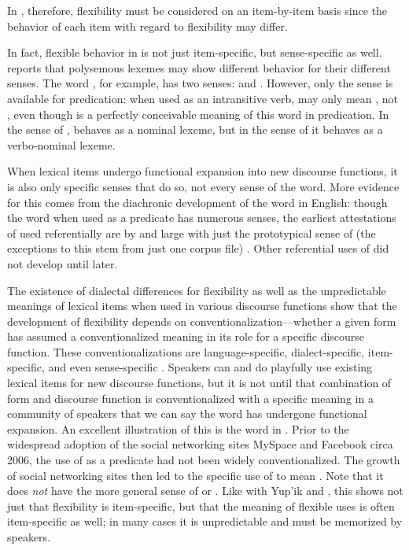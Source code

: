 \noindent In , therefore, flexibility must be considered on an item-by-item basis since the behavior of each item with regard to flexibility may differ.

In fact, flexible behavior in  is not just item-specific, but sense-specific as well. \textcite[54]{Creissels2017} reports that polysemous lexemes may show different behavior for their different senses. The word , for example, has two senses:  and . However, only the  sense is available for predication: when used as an intransitive verb,  may only mean , not , even though  is a perfectly conceivable meaning of this word in predication. In the sense of ,  behaves as a nominal lexeme, but in the sense of  it behaves as a verbo-nominal lexeme.

When lexical items undergo functional expansion into new discourse functions, it is also only specific senses that do so, not every sense of the word. More evidence for this comes from the diachronic development of the word  in English: though the word  when used as a predicate has numerous senses, the earliest attestations of  used referentially are by and large with just the prototypical sense of  (the exceptions to this stem from just one corpus file) \parencite[76]{Gries2006}. Other referential uses of  did not develop until later.

The existence of dialectal differences for flexibility as well as the unpredictable meanings of lexical items when used in various discourse functions show that the development of flexibility depends on conventionalization—whether a given form has assumed a conventionalized meaning in its role for a specific discourse function. These conventionalizations are language-specific, dialect-specific, item-specific, and even sense-specific \parencite[97]{Croft2000}. Speakers can and do playfully use existing lexical items for new discourse functions, but it is not until that combination of form and discourse function is conventionalized with a specific meaning in a community of speakers that we can say the word has undergone functional expansion. An excellent illustration of this is the word  in . Prior to the widespread adoption of the social networking sites MySpace and Facebook circa 2006, the use of  as a predicate had not been widely conventionalized. The growth of social networking sites then led to the specific use of  to mean . Note that it does \emph{not} have the more general sense of  or . Like with Yup'ik and , this shows not just that flexibility is item-specific, but that the meaning of flexible uses is often item-specific as well; in many cases it is unpredictable and must be memorized by speakers.

